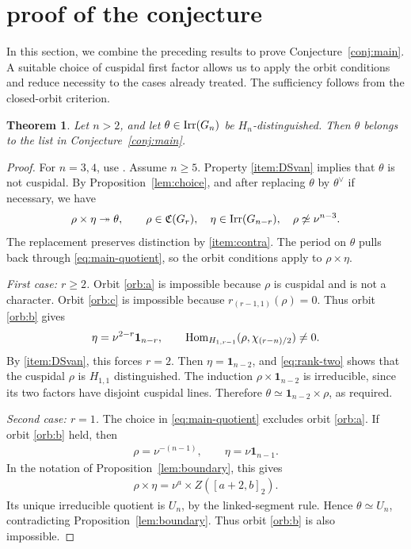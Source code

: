 \documentclass[11pt,leqno]{amsart}
\numberwithin{equation}{section}
\theoremstyle{plain}
\newtheorem{theorem}{Theorem}[section]
\theoremstyle{definition}
\theoremstyle{remark}
\newcommand{\one}{\mathbf{1}}
\newcommand{\onto}{\twoheadrightarrow}
\newcommand{\seg}[2]{[#1,#2]_2}
\begin{document}
	\section{proof of the conjecture}
	In this section, we combine the preceding results to prove Conjecture~\ref{conj:main}. A suitable choice of cuspidal first factor allows us to apply the orbit conditions and
	reduce necessity to the cases already treated. 
	The sufficiency follows from the closed-orbit criterion.
	\begin{theorem}\label{prop:necessity}
		Let $n>2$, and let $\theta\in {\rm Irr}(G_n)$ be $H_n$-distinguished. Then \(\theta\) belongs to the list in Conjecture~\ref{conj:main}.
	\end{theorem}
	\begin{proof}
		For $n=3,4$, use \cite[Theorems 3.3 and 4.3]{DSV}.
		Assume $n \ge 5 $. Property \ref{item:DSvan} implies that $\theta$ is not cuspidal. 
		By Proposition~\ref{lem:choice}, and after replacing $\theta$ by $\theta^\vee$ if necessary, we have
		\begin{equation}\label{eq:main-quotient}
			\rho\times\eta\onto\theta,\qquad
			\rho\in \mathfrak{C}(G_r),\quad \eta\in {\rm Irr}(G_{n-r}),\quad \rho\not\simeq\nu^{n-3}.
		\end{equation}
		The replacement preserves distinction by \ref{item:contra}.
		The period on \(\theta\) pulls back through \eqref{eq:main-quotient},
		so the orbit conditions apply to \(\rho\times\eta\).
		
		\smallskip
		\noindent\emph{First case: \(r\ge2\).}
		Orbit \ref{orb:a} is impossible because $\rho$ is cuspidal and is not a character. 
		Orbit \ref{orb:c} is impossible because $r_{(r-1,1)}(\rho)=0$. 
		Thus orbit \ref{orb:b} gives
		\begin{equation}\label{eq:rank-r-closed}
			\eta=\nu^{2-r}\one_{n-r},\qquad {\rm Hom}_{H_{1,r-1}}(\rho,\chi_{(r-n)/2})\ne0.
		\end{equation}
		By \ref{item:DSvan}, this forces $r=2$.
		Then $\eta=\one_{n-2}$, and \eqref{eq:rank-two} shows that the cuspidal $\rho$ is $H_{1,1}$ distinguished.
		The induction $\rho\times\one_{n-2}$ is irreducible, since its two factors have disjoint cuspidal lines. 
		Therefore $\theta\simeq\one_{n-2}\times\rho$, as required.
		
		\smallskip
		\noindent\emph{Second case: $r=1$.}
		The choice in \eqref{eq:main-quotient} excludes orbit \ref{orb:a}.
		If orbit \ref{orb:b} held, then
		\begin{align*}
			\rho=\nu^{-(n-1)},\qquad \eta=\nu\one_{n-1}.
		\end{align*}
		In the notation of Proposition~\ref{lem:boundary}, this gives
		\begin{align*}
			\rho\times\eta=\nu^a\times Z(\seg{a+2}b).
		\end{align*}
		Its unique irreducible quotient is $U_n$, by the linked-segment rule.
		Hence $\theta\simeq U_n$, contradicting Proposition~\ref{lem:boundary}. 
		Thus orbit \ref{orb:b} is also impossible.
		

\end{proof}
\end{document}
